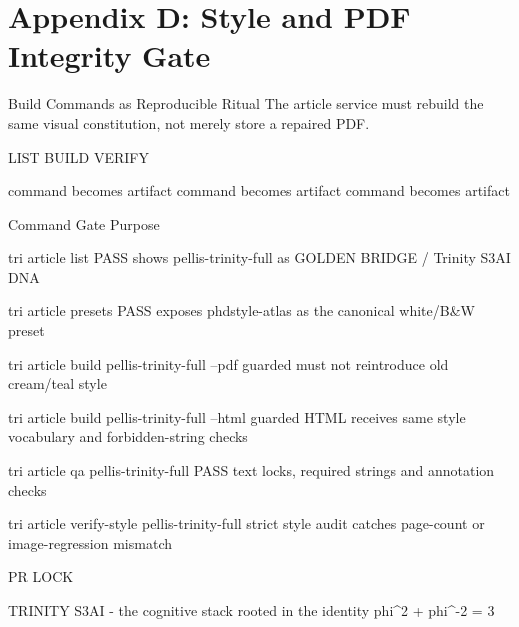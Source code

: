 
\section{Appendix D: Style and PDF Integrity Gate}

Build Commands as Reproducible Ritual
       The article service must rebuild the same visual constitution, not merely store a repaired
                                                 PDF.

                              LIST                                      BUILD                                      VERIFY

                    command becomes artifact                    command becomes artifact                   command becomes artifact

                         Command                                      Gate                                          Purpose

 tri article list                                           PASS                     shows pellis-trinity-full as GOLDEN BRIDGE / Trinity S3AI
                                                                                     DNA

 tri article presets                                        PASS                     exposes phdstyle-atlas as the canonical white/B\&W preset

 tri article build pellis-trinity-full --pdf                guarded                  must not reintroduce old cream/teal style

 tri article build pellis-trinity-full --html               guarded                  HTML receives same style vocabulary and forbidden-string checks

 tri article qa pellis-trinity-full                         PASS                     text locks, required strings and annotation checks

 tri article verify-style pellis-trinity-full               strict                   style audit catches page-count or image-regression mismatch

  PR LOCK

                                      TRINITY S3AI - the cognitive stack rooted in the identity phi\textasciicircum{}2 + phi\textasciicircum{}-2 = 3